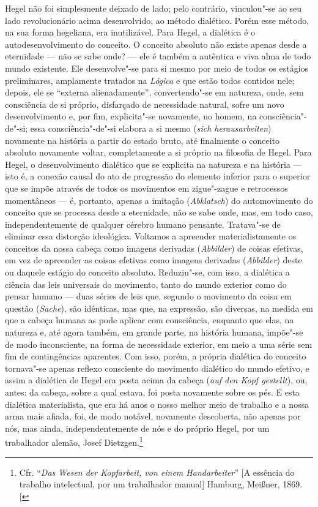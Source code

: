 Hegel não
foi simplesmente deixado de lado; pelo contrário, vinculou"-se ao seu
lado revolucionário acima desenvolvido, ao método dialético. Porém esse
método, na sua forma hegeliana, era inutilizável.
Para Hegel,
a dialética é o autodesenvolvimento do conceito. O conceito absoluto não
existe apenas desde a eternidade --- não se sabe onde? --- ele é também a
autêntica e viva alma de todo mundo existente. Ele desenvolve"-se para si
mesmo por meio de todos os estágios preliminares, amplamente tratados na
\emph{Lógica} e que estão todos contidos nele; depois, ele se ``externa
alienadamente'', convertendo"-se em natureza, onde, sem consciência de si
próprio, disfarçado de necessidade natural, sofre um novo
desenvolvimento e, por fim, explicita"-se novamente, no homem, na
consciência"-de"-si; essa consciência"-de"-si elabora a si mesmo (\emph{sich
herausarbeiten}) novamente na história a partir do estado bruto, até
finalmente o conceito absoluto novamente voltar, completamente a si
próprio na filosofia
de Hegel.
Para Hegel,
o desenvolvimento dialético que se explicita na natureza e na história ---
isto é, a conexão causal do ato de progressão do elemento inferior para
o superior que se impõe através de todos os movimentos em zigue"-zague e
retrocessos momentâneos --- é, portanto, apenas a imitação
(\emph{Abklatsch}) do automovimento do conceito que se processa desde a
eternidade, não se sabe onde, mas, em todo caso, independentemente de
qualquer cérebro humano pensante. Tratava"-se de eliminar essa distorção
ideológica. Voltamos a apreender materialistamente os conceitos da nossa
cabeça como imagens derivadas (\emph{Abbilder}) de coisas efetivas, em
vez de apreender as coisas efetivas como imagens derivadas
(\emph{Abbilder}) deste ou daquele estágio do conceito absoluto.
Reduziu"-se, com isso, a dialética a ciência das leis universais do
movimento, tanto do mundo exterior como do pensar humano --- duas séries
de leis que, segundo o movimento da coisa em questão (\emph{Sache}), são
idênticas, mas que, na expressão, são diversas, na medida em que a
cabeça humana as pode aplicar com consciência, enquanto que elas, na
natureza e, até agora também, em grande parte, na história humana,
impõe"-se de modo inconsciente, na forma de necessidade exterior, em meio
a uma série sem fim de contingências aparentes. Com isso, porém, a
própria dialética do conceito tornava"-se apenas reflexo consciente do
movimento dialético do mundo efetivo, e assim a dialética
de Hegel era
posta acima da cabeça (\emph{auf den Kopf gestellt}), ou, antes: da
cabeça, sobre a qual estava, foi posta novamente sobre os pés. E esta
dialética materialista, que era há anos o nosso melhor meio de trabalho
e a nossa arma mais afiada, foi, de modo notável, novamente descoberta,
não apenas por nós, mas ainda, independentemente de nós e do próprio
Hegel,
por um trabalhador
alemão, Josef Dietzgen.\footnote{Cfr. ``\emph{Das Wesen der Kopfarbeit,
  von einem Handarbeiter}'' {[}A essência do trabalho intelectual, por
  um trabalhador manual{]} Hamburg, Meißner, 1869. {[}\versal{N.\,E.}{]}}

